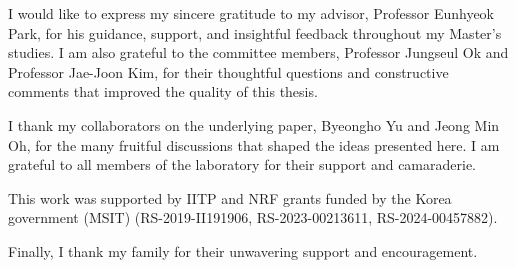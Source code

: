 
I would like to express my sincere gratitude to my advisor, Professor Eunhyeok Park, for his guidance, support, and insightful feedback throughout my Master's studies. I am also grateful to the committee members, Professor Jungseul Ok and Professor Jae-Joon Kim, for their thoughtful questions and constructive comments that improved the quality of this thesis.

I thank my collaborators on the underlying paper, Byeongho Yu and Jeong Min Oh, for the many fruitful discussions that shaped the ideas presented here. I am grateful to all members of the laboratory for their support and camaraderie.

This work was supported by IITP and NRF grants funded by the Korea government (MSIT) (RS-2019-II191906, RS-2023-00213611, RS-2024-00457882).

Finally, I thank my family for their unwavering support and encouragement.

